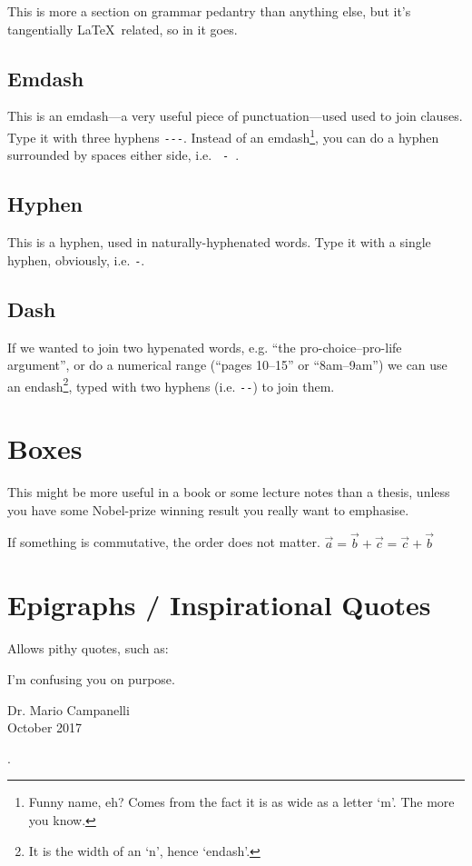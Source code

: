 \documentclass[../main]{subfiles}
\begin{document}
This is more a section on grammar pedantry than anything else, but it's tangentially \LaTeX\ related, so in it goes.

\subsection{Emdash}
This is an emdash---a very useful piece of punctuation---used used to join clauses. Type it with three hyphens \verb|---|. Instead of an emdash\footnote{Funny name, eh? Comes from the fact it is as wide as a letter `m'. The more you know.}, you can do a hyphen surrounded by spaces either side, i.e. \verb| - |.

\subsection{Hyphen} 
This is a hyphen, used in naturally-hyphenated words. Type it with a single hyphen, obviously, i.e.  \verb|-|.

\subsection{Dash}
If we wanted to join two hypenated words, e.g. ``the pro-choice--pro-life argument'', or do a numerical range (``pages 10--15'' or ``8am--9am'') we can use an endash\footnote{It is the width of an `n', hence `endash'.}, typed with two hyphens (i.e. \verb|--|) to join them.

\section{Boxes}\label{sec:boxes}

This might be more useful in a book or some lecture notes than a thesis, unless you have some Nobel-prize winning result you really want to emphasise.

\begin{mdframed}[style=MyFrame,nobreak=true,align=center]
If something is commutative, the order does not matter. $\vec{a}=\vec{b}+\vec{c}=\vec{c}+\vec{b}$
\end{mdframed}

\section{Epigraphs / Inspirational Quotes}\label{sec:epigraphs}

Allows pithy quotes, such as:

\epigraph{I'm confusing you on purpose.}{Dr. Mario Campanelli\\October 2017}.
\end{document}
